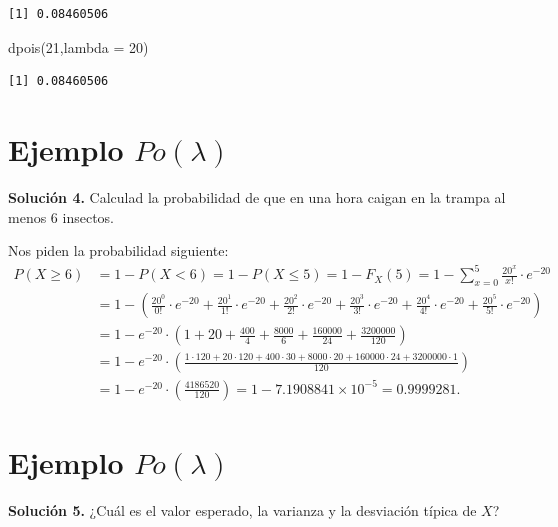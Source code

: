 \documentclass[
  letterpaper,
  DIV=11,
  numbers=noendperiod]{scrreprt}
\newenvironment{Shaded}{\begin{snugshade}}{\end{snugshade}}
\newcommand{\AttributeTok}[1]{\textcolor[rgb]{0.40,0.45,0.13}{#1}}
\newcommand{\DecValTok}[1]{\textcolor[rgb]{0.68,0.00,0.00}{#1}}
\newcommand{\FunctionTok}[1]{\textcolor[rgb]{0.28,0.35,0.67}{#1}}
\newcommand{\NormalTok}[1]{\textcolor[rgb]{0.00,0.23,0.31}{#1}}
\begin{document}
\begin{verbatim}
[1] 0.08460506
\end{verbatim}

\begin{Shaded}
\begin{Highlighting}[]
\FunctionTok{dpois}\NormalTok{(}\DecValTok{21}\NormalTok{,}\AttributeTok{lambda =} \DecValTok{20}\NormalTok{)}
\end{Highlighting}
\end{Shaded}

\begin{verbatim}
[1] 0.08460506
\end{verbatim}

\section{\texorpdfstring{Ejemplo
\(Po(\lambda)\)}{Ejemplo Po(\textbackslash lambda)}}\label{ejemplo-polambda-5}

\textbf{Solución 4.} Calculad la probabilidad de que en una hora caigan
en la trampa al menos 6 insectos.

Nos piden la probabilidad siguiente: \[
\begin{array}{rl}
 P(X\geq 6)&=1- P(X<6)=1-P(X\leq 5)=1-F_X(5)=1-\displaystyle\sum_{x=0}^{5} \frac{20^{x}}{x!}\cdot e^{-20}\\
 &=
 1-\left(\frac{20^{0}}{0!}\cdot e^{-20}+\frac{20^{1}}{1!}\cdot e^{-20}+\frac{20^{2}}{2!}\cdot e^{-20}+\frac{20^{3}}{3!}\cdot e^{-20}+\frac{20^{4}}{4!}\cdot e^{-20}+\frac{20^{5}}{5!}\cdot e^{-20}\right)\\
 &=
 1-e^{-20}\cdot \left(1+20+\frac{400}{4}+\frac{8000}{6}+\frac{160000}{24}+\frac{3200000}{120}\right)\\
 &=
 1-e^{-20} \cdot \left(\frac{1 \cdot 120+20\cdot 120+400\cdot 30+8000\cdot 20+160000\cdot 24+3200000\cdot 1}{120}\right)\\
 &= 1-e^{-20}\cdot\left(\frac{4186520}{120}\right)=1-\ensuremath{7.1908841\times 10^{-5}} =0.9999281.
\end{array}
\]

\section{\texorpdfstring{Ejemplo
\(Po(\lambda)\)}{Ejemplo Po(\textbackslash lambda)}}\label{ejemplo-polambda-6}

\textbf{Solución 5.} ¿Cuál es el valor esperado, la varianza y la
desviación típica de \(X\)?
\end{document}
